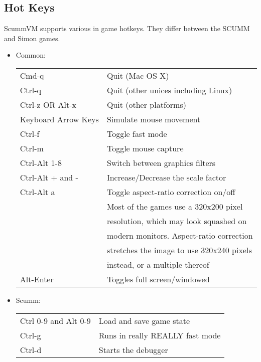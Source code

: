 

\subsection{Hot Keys}
ScummVM supports various in game hotkeys. They differ between the SCUMM and
Simon games.
\begin{itemize}
\item Common:\\
  \begin{tabular}{ll}
    Cmd-q                  & Quit (Mac OS X)\\
    Ctrl-q                 & Quit (other unices including Linux)\\
    Ctrl-z OR Alt-x        & Quit (other platforms)\\
    Keyboard Arrow Keys    & Simulate mouse movement\\
    Ctrl-f                 & Toggle fast mode\\
    Ctrl-m                 & Toggle mouse capture\\
    Ctrl-Alt 1-8           & Switch between graphics filters\\
    Ctrl-Alt + and -       & Increase/Decrease the scale factor\\
    Ctrl-Alt a             & Toggle aspect-ratio correction on/off\\
                           & Most of the games use a 320x200 pixel\\
                           & resolution, which may look squashed on\\
                           & modern monitors. Aspect-ratio correction\\
                           & stretches the image to use 320x240 pixels\\
                           & instead, or a multiple thereof\\
    Alt-Enter              & Toggles full screen/windowed\\
  \end{tabular}
\item Scumm:\\
  \begin{tabular}{ll}
    Ctrl 0-9 and Alt 0-9   & Load and save game state\\
    Ctrl-g                 & Runs in really REALLY fast mode\\
    Ctrl-d                 & Starts the debugger\\

\end{tabular}
\end{itemize}
